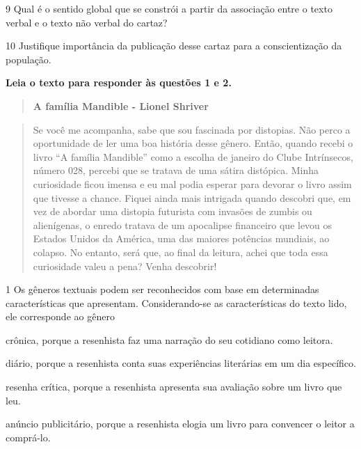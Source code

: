 \num{9} Qual é o sentido global que se constrói a partir da associação
entre o texto verbal e o texto não verbal do cartaz?


\num{10} Justifique importância da publicação desse cartaz para a
conscientização da população.



\textbf{Leia o texto para responder às questões 1 e 2.}

\begin{quote}
\textbf{A família Mandible - Lionel Shriver}
\end{quote}

\begin{quote}
Se você me acompanha, sabe que sou fascinada por distopias. Não perco a
oportunidade de ler uma boa história desse gênero. Então, quando recebi
o livro ``A família Mandible'' como a escolha de janeiro do Clube
Intrínsecos, número 028, percebi que se tratava de uma sátira distópica.
Minha curiosidade ficou imensa e eu mal podia esperar para devorar o
livro assim que tivesse a chance. Fiquei ainda mais intrigada quando
descobri que, em vez de abordar uma distopia futurista com invasões de
zumbis ou alienígenas, o enredo tratava de um apocalipse financeiro que
levou os Estados Unidos da América, uma das maiores potências mundiais,
ao colapso. No entanto, será que, ao final da leitura, achei que toda
essa curiosidade valeu a pena? Venha descobrir!
\end{quote}


\num{1} Os gêneros textuais podem ser reconhecidos com base em
determinadas características que apresentam. Considerando-se as
características do texto lido, ele corresponde ao gênero

\begin{escolha}
\item
  crônica, porque a resenhista faz uma narração do seu cotidiano como
  leitora.
\item
  diário, porque a resenhista conta suas experiências literárias em um
  dia específico.
\item
  resenha crítica, porque a resenhista apresenta sua avaliação sobre um
  livro que leu.
\item
  anúncio publicitário, porque a resenhista elogia um livro para
  convencer o leitor a comprá-lo.
\end{escolha}

